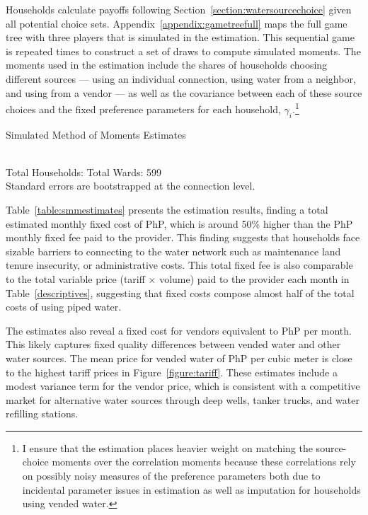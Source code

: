 \documentclass[12pt]{article}
\begin{document}
Households calculate payoffs following Section~\ref{section:watersourcechoice} given all potential choice sets.  Appendix~\ref{appendix:gametreefull} maps the full game tree with three players that is simulated in the estimation.  This sequential game is repeated times to construct a set of draws to compute simulated moments.  The moments used in the estimation include the shares of households choosing different sources --- using an individual connection, using water from a neighbor, and using from a vendor --- as well as the covariance between each of these source choices and the fixed preference parameters for each household, $\gamma_i$.\footnote{I ensure that the estimation places heavier weight on matching the source-choice moments over the correlation moments because these correlations rely on possibly noisy measures of the preference parameters both due to incidental parameter issues in estimation as well as imputation for households using vended water. }  %

\begin{table}
\centering
\caption{Simulated Method of Moments Estimates}\label{table:smmestimates}
\\
\vspace{.05cm}
\footnotesize{ Total Households:     Total Wards:  599 \\ Standard errors are bootstrapped at the connection level.   }
\end{table}

Table~\ref{table:smmestimates} presents the estimation results, finding a total estimated monthly fixed cost of PhP, which is around 50\% higher than the PhP monthly fixed fee paid to the provider.  This finding suggests that households face sizable barriers to connecting to the water network such as maintenance land tenure insecurity, or administrative costs.  This total fixed fee is also comparable to the total variable price (tariff $\times$ volume) paid to the provider each month in Table~\ref{descriptives}, suggesting that fixed costs compose almost half of the total costs of using piped water.  

The estimates also reveal a fixed cost for vendors equivalent to PhP per month.  This likely captures fixed quality differences between vended water and other water sources.  The mean price for vended water of PhP per cubic meter is close to the highest tariff prices in Figure~\ref{figure:tariff}.  These estimates include a modest variance term for the vendor price, which is consistent with a competitive market for alternative water sources through deep wells, tanker trucks, and water refilling stations.  
\end{document}
